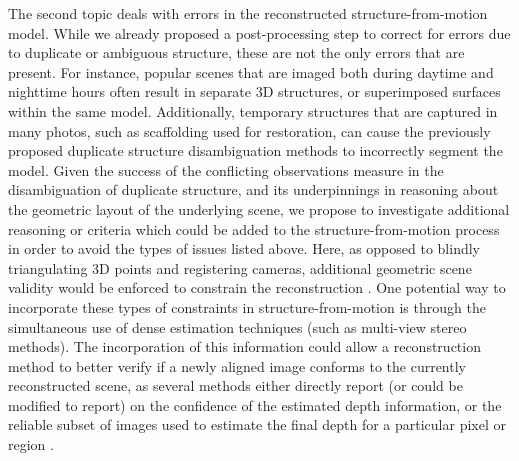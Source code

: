 The second topic deals with errors in the reconstructed structure-from-motion model.
While we already proposed a post-processing step to correct for errors due to duplicate or ambiguous structure, these are not the only errors that are present.
For instance, popular scenes that are imaged both during daytime and nighttime hours often result in separate 3D structures, or superimposed surfaces within the same model.
Additionally, temporary structures that are captured in many photos, such as scaffolding used for restoration, can cause the previously proposed duplicate structure disambiguation methods to incorrectly segment the model.
Given the success of the conflicting observations measure in the disambiguation of duplicate structure, and its underpinnings in reasoning about the geometric layout of the underlying scene, we propose to investigate additional reasoning or criteria which could be added to the structure-from-motion process in order to avoid the types of issues listed above.
Here, as opposed to blindly triangulating 3D points and registering cameras, additional geometric scene validity would be enforced to constrain the reconstruction \cite{furukawa2009_manhattan_stereo, gallup2010_planar_stereo, cohen2012_exploiting_symmetries, wu2012_schematic_reconstruction, bao2013_semantic_priors, hane2013_reconstruction_segmantation, hane2014_shape_priors}.
One potential way to incorporate these types of constraints in structure-from-motion is through the simultaneous use of dense estimation techniques (such as multi-view stereo methods).
The incorporation of this information could allow a reconstruction method to better verify if a newly aligned image conforms to the currently reconstructed scene, as several methods either directly report (or could be modified to report) on the confidence of the estimated depth information, or the reliable subset of images used to estimate the final depth for a particular pixel or region \cite{strecha2006_outlier_depth, goesele2007_commonunity_stereo, furukawa2010_pmvs, zheng2014_depthmap_estimation}.